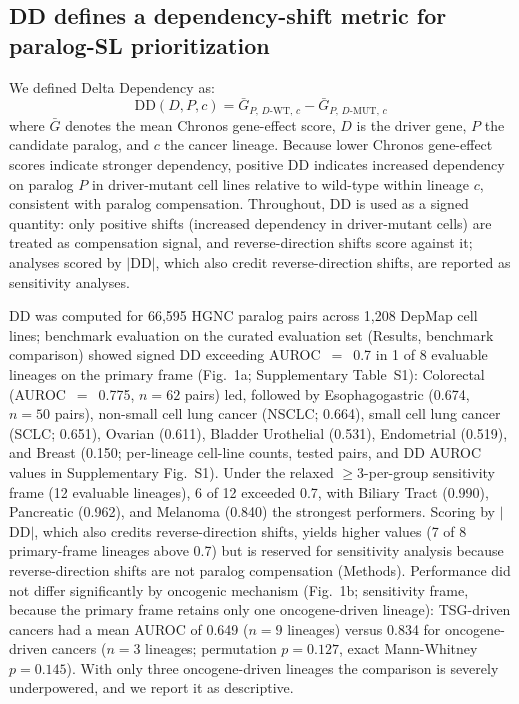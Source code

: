 \documentclass[11pt,a4paper]{article}
\begin{document}
\subsection*{DD defines a dependency-shift metric for paralog-SL prioritization}

We defined Delta Dependency as:
\begin{equation}
\text{DD}(D, P, c) = \bar{G}_{P,\,D\text{-WT},\,c} - \bar{G}_{P,\,D\text{-MUT},\,c}
\label{eq:dd}
\end{equation}
where $\bar{G}$ denotes the mean Chronos gene-effect score, $D$ is the driver gene, $P$ the candidate paralog, and $c$ the cancer lineage. Because lower Chronos gene-effect scores indicate stronger dependency, positive DD indicates increased dependency on paralog $P$ in driver-mutant cell lines relative to wild-type within lineage $c$, consistent with paralog compensation. Throughout, DD is used as a signed quantity: only positive shifts (increased dependency in driver-mutant cells) are treated as compensation signal, and reverse-direction shifts score against it; analyses scored by $|$DD$|$, which also credit reverse-direction shifts, are reported as sensitivity analyses.

DD was computed for 66,595 HGNC paralog pairs across 1,208 DepMap cell lines; benchmark evaluation on the curated evaluation set (Results, benchmark comparison) showed signed DD exceeding AUROC~$=$~0.7 in 1 of 8 evaluable lineages on the primary frame (Fig.~1a; Supplementary Table~S1): Colorectal (AUROC~$=$~0.775, $n=62$ pairs) led, followed by Esophagogastric (0.674, $n=50$ pairs), non-small cell lung cancer (NSCLC; 0.664), small cell lung cancer (SCLC; 0.651), Ovarian (0.611), Bladder Urothelial (0.531), Endometrial (0.519), and Breast (0.150; per-lineage cell-line counts, tested pairs, and DD AUROC values in Supplementary Fig.~S1). Under the relaxed $\geq$3-per-group sensitivity frame (12 evaluable lineages), 6 of 12 exceeded 0.7, with Biliary Tract (0.990), Pancreatic (0.962), and Melanoma (0.840) the strongest performers. Scoring by $|$DD$|$, which also credits reverse-direction shifts, yields higher values (7 of 8 primary-frame lineages above 0.7) but is reserved for sensitivity analysis because reverse-direction shifts are not paralog compensation (Methods). Performance did not differ significantly by oncogenic mechanism (Fig.~1b; sensitivity frame, because the primary frame retains only one oncogene-driven lineage): TSG-driven cancers had a mean AUROC of 0.649 ($n=9$ lineages) versus 0.834 for oncogene-driven cancers ($n=3$ lineages; permutation $p=0.127$, exact Mann-Whitney $p=0.145$). With only three oncogene-driven lineages the comparison is severely underpowered, and we report it as descriptive.
\end{document}
